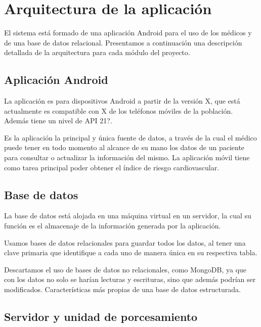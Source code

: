 \documentclass[11pt,spanish,
		listoftables,listoffigures]
		{tfgplantilla}
\begin{document}
\chapter{Arquitectura de la aplicaci\'on}

El sistema está formado de una aplicación Android para el uso de los médicos y de una base de datos relacional. Presentamos a continuación una descripción detallada de la arquitectura para cada módulo del proyecto. 

\section {Aplicación Android}

La aplicación es para dispositivos Android a partir de la versión X, que está actualmente es compatible con X de los teléfonos móviles de la población. Además tiene un nivel de API 21?.

Es la aplicación la principal y única fuente de datos, a través de la cual el médico puede tener en todo momento al alcance de su mano los datos de un paciente para consultar o actualizar la información del mismo. La aplicación móvil tiene como tarea principal poder obtener el índice de riesgo cardiovascular.

\section {Base de datos}

La base de datos está alojada en una máquina virtual en un servidor, la cual su función es el almacenaje de la información generada por la aplicación.

Usamos bases de datos relacionales para guardar todos los datos, al tener una clave primaria que identifique a cada uno de manera única en su respectiva tabla. 

Descartamos el uso de bases de datos no relacionales, como MongoDB, ya que con los datos no solo se harían lecturas y escrituras, sino que además podrían ser modificados. Características más propias de una base de datos estructurada.

\section {Servidor y unidad de porcesamiento}

\end{document}
